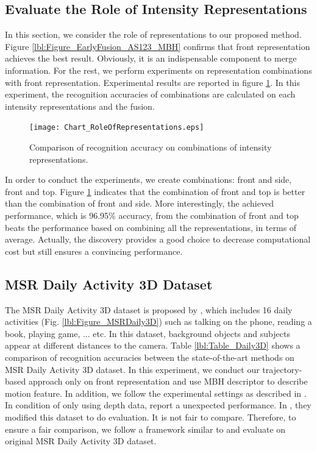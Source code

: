 \documentclass[review]{elsarticle}
\begin{document}
\subsection{Evaluate the Role of Intensity Representations}

In this section, we consider the role of representations to our proposed method. Figure \ref{lbl:Figure_EarlyFusion_AS123_MBH} confirms that front representation achieves the best result. Obviously, it is an indispensable component to merge information. For the rest, we perform experiments on representation combinations with front representation. Experimental results are reported in figure \ref{lbl:Figure_CombinationsFRONTSIDETOP}. In this experiment, the recognition accuracies of combinations are calculated on each intensity representations and the fusion.

\begin{figure}[H]
	\begin{center}
		\texttt{[image: Chart\_RoleOfRepresentations.eps]}
	\end{center}
	\caption{\label{lbl:Figure_CombinationsFRONTSIDETOP}Comparison of recognition accuracy on combinations of intensity representations.}
\end{figure}

In order to conduct the experiments, we create combinations: front and side, front and top. Figure \ref{lbl:Figure_CombinationsFRONTSIDETOP} indicates that the combination of front and top is better than the combination of front and side. More interestingly, the achieved performance, which is 96.95\% accuracy, from the combination of front and top beats the performance based on combining all the representations, in terms of average. Actually, the discovery provides a good choice to decrease computational cost but still ensures a convincing performance.

\subsection{MSR Daily Activity 3D Dataset}

 The  MSR Daily Activity 3D dataset is proposed by \cite{wang2012mining}, which includes 16 daily activities  (Fig. \ref{lbl:Figure_MSRDaily3D}) such as talking on the phone, reading a book, playing game, ... etc. In this dataset, background objects and subjects appear at different distances to the camera. Table \ref{lbl:Table_Daily3D} shows a comparison of recognition accuracies between the state-of-the-art methods on MSR Daily Activity 3D dataset. In this experiment, we conduct our trajectory-based approach only on front representation and use MBH descriptor to describe motion feature. In addition, we follow the experimental settings as described in \cite{wang2012mining}. In condition of only using depth data, \cite{wang2012mining, oreifej2013hon4d, xia2013spatio} report a unexpected performance. In \cite{xia2013spatio}, they modified this dataset to do evaluation. It is not fair to compare. Therefore, to ensure a fair comparison, we follow a framework similar to \cite{xia2013spatio} and evaluate on original MSR Daily Activity 3D dataset.
 
\end{document}
